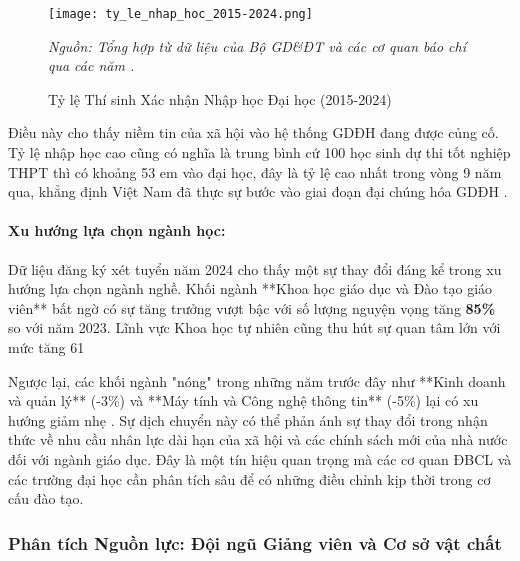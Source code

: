 \documentclass[12pt, a4paper, openany]{report}
\begin{document}
\begin{figure}[h!]
    \centering
    \texttt{[image: ty\_le\_nhap\_hoc\_2015-2024.png]}
    
    \caption{Tỷ lệ Thí sinh Xác nhận Nhập học Đại học (2015-2024)}
    \label{fig:ty_le_nhap_hoc_full}
    \vspace{0.2cm}
    
    \footnotesize{\textit{Nguồn: Tổng hợp từ dữ liệu của Bộ GD\&ĐT và các cơ quan báo chí qua các năm 
    \cite{ref1, ref2, ref3, ref5, ref7, ref12, ref19, stat_nhap_hoc_2024}.}}
\end{figure}


Điều này cho thấy niềm tin của xã hội vào hệ thống GDĐH đang được củng cố. Tỷ lệ nhập học cao cũng có nghĩa là trung bình cứ 100 học sinh dự thi tốt nghiệp THPT thì có khoảng 53 em vào đại học, đây là tỷ lệ cao nhất trong vòng 9 năm qua, khẳng định Việt Nam đã thực sự bước vào giai đoạn đại chúng hóa GDĐH \cite{stat_ty_le_vao_dh_2023}.

\paragraph{Xu hướng lựa chọn ngành học:}
Dữ liệu đăng ký xét tuyển năm 2024 cho thấy một sự thay đổi đáng kể trong xu hướng lựa chọn ngành nghề. Khối ngành **Khoa học giáo dục và Đào tạo giáo viên** bất ngờ có sự tăng trưởng vượt bậc với số lượng nguyện vọng tăng \textbf{85\%} so với năm 2023. Lĩnh vực Khoa học tự nhiên cũng thu hút sự quan tâm lớn với mức tăng 61%

Ngược lại, các khối ngành "nóng" trong những năm trước đây như **Kinh doanh và quản lý** (-3\%) và **Máy tính và Công nghệ thông tin** (-5\%) lại có xu hướng giảm nhẹ \cite{stat_tuyen_sinh_2024_so_lieu}. Sự dịch chuyển này có thể phản ánh sự thay đổi trong nhận thức về nhu cầu nhân lực dài hạn của xã hội và các chính sách mới của nhà nước đối với ngành giáo dục. Đây là một tín hiệu quan trọng mà các cơ quan ĐBCL và các trường đại học cần phân tích sâu để có những điều chỉnh kịp thời trong cơ cấu đào tạo.

\subsubsection{Phân tích Nguồn lực: Đội ngũ Giảng viên và Cơ sở vật chất}
\end{document}
